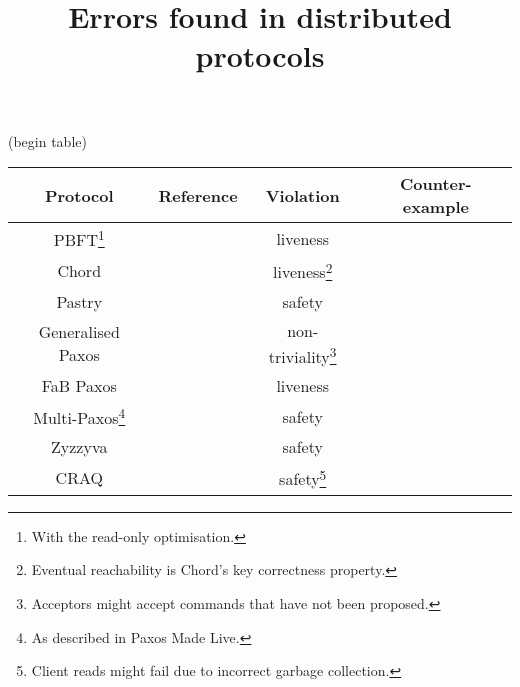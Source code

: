 \documentclass{article}
\title{Errors found in distributed protocols}
\date{}
\begin{document}
\maketitle

\begin{center}
    {\footnotesize \color{white} (begin table)}
\end{center}

\begin{center}
\begin{tabular}{ c c c c }
    \toprule
    Protocol & Reference & Violation & Counter-example \\
    \midrule

    PBFT\footnote{With the read-only optimisation.} &
    \cite{castroPracticalByzantineFault1999} & liveness &
    \cite{bergerMakingReadsBFT2021} \\

    Chord & \cite{stoicaChordScalablePeertopeer2001,
    liben-nowellAnalysisEvolutionPeertopeer2002} &
    liveness\footnote{Eventual reachability is Chord's key
    correctness property.} & \cite{zaveUsingLightweightModeling2012,
    zaveReasoningIdentifierSpaces2017} \\

    Pastry & \cite{rowstronPastryScalableDecentralized2001} & safety &
    \cite{azmyRigorousCorrectnessProof2016, azmyMachinecheckedCorrectnessProof2018}\\

    Generalised Paxos & \cite{lamportGeneralizedConsensusPaxos2005} &
    non-triviality\footnote{Acceptors might accept commands that have not been
    proposed.} & \cite{sutraFastGenuineGeneralized2010} \\

    FaB Paxos & \cite{martinFastByzantineConsensus2005,
    martinFastByzantineConsensus2006} & liveness &
    \cite{abrahamRevisitingFastPractical2017} \\

    Multi-Paxos\footnote{As described in Paxos Made Live.} &
    \cite{chandraPaxosMadeLive2007} & safety &
    \cite{michaelRecoveringSharedObjects2017} \\

    Zyzzyva & \cite{kotlaZyzzyvaSpeculativeByzantine2007,
    kotlaZyzzyvaSpeculativeByzantine2009} & safety &
    \cite{abrahamRevisitingFastPractical2017} \\

    CRAQ & \cite{terraceObjectStorageCRAQ2009} & safety\footnote{Client reads
    might fail due to incorrect garbage collection.} &
    \cite{whittakerCRAQBug2020} \\


\end{tabular}
\end{center}
\end{document}
